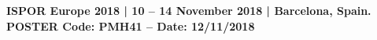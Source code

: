 \documentclass[final]{beamer}
\newlength{\onecolwid}
\begin{document}
\begin{frame}[t]
\begin{columns}[t]
\begin{column}{\onecolwid}


\vspace{-0.5cm}

\begin{center}
\textbf{ISPOR Europe 2018 | 10 -- 14 November 2018 | Barcelona, Spain. POSTER Code: PMH41 -- Date: 12/11/2018}
\end{center}

\end{column} %

\end{columns} %

\end{frame} %
\end{document}
